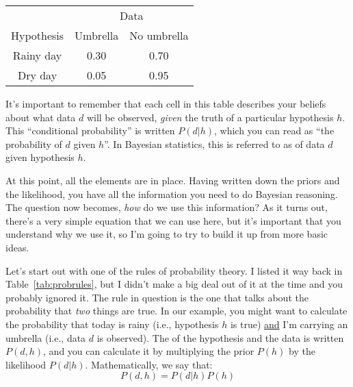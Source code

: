 \begin{center}
\begin{tabular}{c|cc}
 & \multicolumn{2}{|c}{Data} \\ 
Hypothesis & Umbrella & No umbrella \\ \hline
Rainy day & 0.30 & 0.70 \\
Dry day & 0.05 & 0.95 
\end{tabular}
\end{center}

\noindent
It's important to remember that each cell in this table describes your beliefs about what data $d$ will be observed, {\it given} the truth of a particular hypothesis $h$. This ``conditional probability'' is written $P(d|h)$, which you can read as ``the probability of $d$ given $h$''. In Bayesian statistics, this is referred to as  of data $d$ given hypothesis $h$.


At this point, all the elements are in place. Having written down the priors and the likelihood, you have all the information you need to do Bayesian reasoning. The question now becomes, {\it how} do we use this information? As it turns out, there's a very simple equation that we can use here, but it's important that you understand why we use it, so I'm going to try to build it up from more basic ideas.

Let's start out with one of the rules of probability theory. I listed it way back in Table~\ref{tab:probrules}, but I didn't make a big deal out of it at the time and you probably ignored it. The rule in question is the one that talks about the probability that {\it two} things are true. In our example, you might want to calculate the probability that today is rainy (i.e., hypothesis $h$ is true) \underline{and} I'm carrying an umbrella (i.e., data $d$ is observed). The  of the hypothesis and the data is written $P(d,h)$, and you can calculate it by multiplying the prior $P(h)$ by the likelihood $P(d|h)$. Mathematically, we say that:
$$
P(d,h) = P(d|h) P(h)
$$

